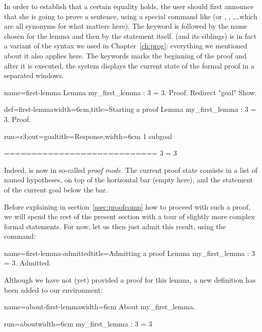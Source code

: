 In order to establish that a certain equality holds, the user should
first announce that she is going to prove a sentence, using a special
command like  (or , ,
,\dots which are all synonyms for what matters here).
The  keyword is followed by the name chosen for the lemma and
then by the statement itself.  (and its siblings) is in fact
a variant of the  syntax we used in
Chapter~\ref{ch:prog}: everything we mentioned about it also applies
here. The  keywords marks the beginning of the proof and
after it is executed, the system displays the current state of the
formal proof in a separated windows.

\begin{coqdef}{name=first-lemma}
Lemma my_first_lemma : 3 = 3.
Proof. Redirect "goal" Show.
\end{coqdef}
\begin{coq}{def=first-lemma}{width=6cm,title=Starting a proof}
Lemma my_first_lemma : 3 = 3.
Proof.
\end{coq}
\begin{coqout}{run=r3;out=goal}{title=Response,width=6cm}
1 subgoal

  ============================
   3 = 3
\end{coqout}
Indeed, \Coq{} is now in so-called \emph{proof mode}. The
current proof state consists in a list of named hypotheses, on top of
the horizontal bar (empty here), and the statement of the current goal
below the bar.

Before explaining in section~\ref{ssec:proofcomp} how to proceed with
such a proof, we will spend the rest of the present section with
a tour of slightly more complex formal statements.
For now, let us then just admit this result, using the 
command:

\begin{coq}{name=first-lemma-admitted}{title=Admitting a proof}
Lemma my_first_lemma : 3 = 3.
Admitted.
\end{coq}

Although we have not (yet) provided a proof for this lemma, a new
definition has been added to our environment:

\begin{coq}{name=about-first-lemma}{width=6cm}
About my_first_lemma.
\end{coq}
\begin{coqout}{run=about}{width=6cm}
my_first_lemma : 3 = 3
\end{coqout}

